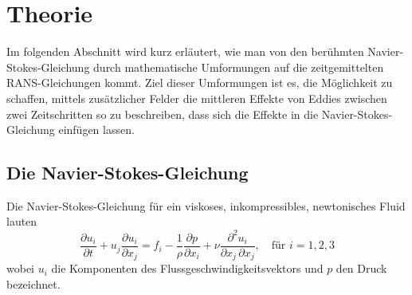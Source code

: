 %
%
%
%
\section{Theorie\label{reynolds:section:teil0}}
%
Im folgenden Abschnitt wird kurz erläutert, wie man von den berühmten Navier-Stokes-Gleichung
durch mathematische Umformungen auf die zeitgemittelten RANS-Gleichungen kommt.
%
Ziel dieser Umformungen ist es, die Möglichkeit zu schaffen, mittels zusätzlicher Felder
die mittleren Effekte von Eddies zwischen zwei Zeitschritten so zu beschreiben, dass sich die
Effekte in die Navier-Stokes-Gleichung einfügen lassen.
%
\subsection{Die Navier-Stokes-Gleichung}
%
Die Navier-Stokes-Gleichung für ein viskoses, inkompressibles, newtonisches Fluid lauten
%
\begin{equation}
    \label{reynolds:eqs:impulse}
    \frac{\partial u_i}{\partial t} + u_j \frac{\partial u_i}{\partial x_j} =
        f_i - \frac{1}{\rho} \frac{\partial p}{\partial x_i} + 
        \nu \frac{\partial^2 u_i}{\partial x_j\, \partial x_j},\quad\text{für $i = 1,2,3$}
\end{equation}
%
wobei $u_i$ die Komponenten des Flussgeschwindigkeitsvektors und $p$ den Druck bezeichnet.

